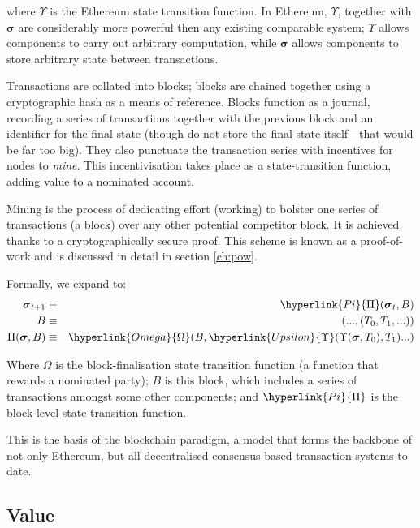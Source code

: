 \documentclass[9pt,oneside]{amsart}
\begin{document}
\begin{multicols}{2}
where $\Upsilon$ is the Ethereum state transition function. In Ethereum, $\Upsilon$, together with $\boldsymbol{\sigma}$ are considerably more powerful then any existing comparable system; $\Upsilon$ allows components to carry out arbitrary computation, while $\boldsymbol{\sigma}$ allows components to store arbitrary state between transactions.

Transactions are collated into blocks; blocks are chained together using a cryptographic hash as a means of reference. Blocks function as a journal, recording a series of transactions together with the previous block and an identifier for the final state (though do not store the final state itself---that would be far too big). They also punctuate the transaction series with incentives for nodes to \textit{mine}. This incentivisation takes place as a state-transition function, adding value to a nominated account.

Mining is the process of dedicating effort (working) to bolster one series of transactions (a block) over any other potential competitor block. It is achieved thanks to a cryptographically secure proof. This scheme is known as a proof-of-work and is discussed in detail in section \ref{ch:pow}.

Formally, we expand to:
\begin{eqnarray}
\boldsymbol{\sigma}_{t+1} & \equiv & \hyperlink{Pi}{\Pi}(\boldsymbol{\sigma}_{t}, B) \\
B & \equiv & (..., (T_0, T_1, ...) ) \\
\Pi(\boldsymbol{\sigma}, B) & \equiv & \hyperlink{Omega}{\Omega}(B, \hyperlink{Upsilon}{\Upsilon}(\Upsilon(\boldsymbol{\sigma}, T_0), T_1) ...)
\end{eqnarray}

Where \hyperlink{Omega}{$\Omega$} is the block-finalisation state transition function (a function that rewards a nominated party); \hyperlink{block}{$B$} is this block, which includes a series of transactions amongst some other components; and $\hyperlink{Pi}{\Pi}$ is the block-level state-transition function.

This is the basis of the blockchain paradigm, a model that forms the backbone of not only Ethereum, but all decentralised consensus-based transaction systems to date.

\subsection{Value}


\end{multicols}
\end{document}
